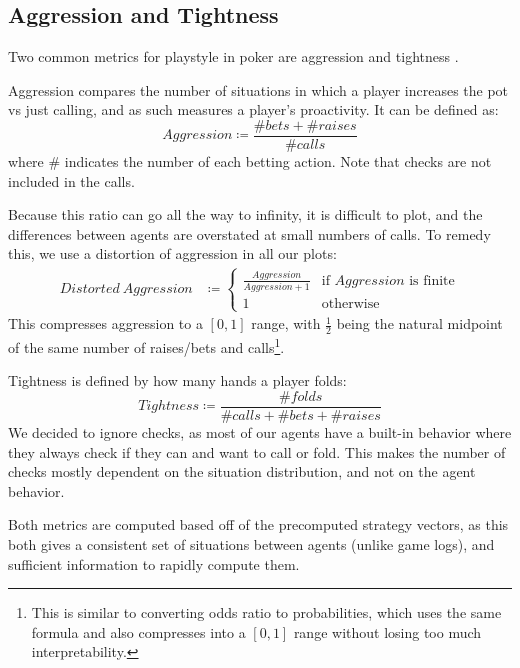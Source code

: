 
\subsection{Aggression and Tightness}

Two common metrics for playstyle in poker are aggression and tightness \cite{PokerStrategy}.

Aggression compares the number of situations in which a player increases the pot vs just calling, and as such measures a player's proactivity. It can be defined as:
\begin{equation}
    Aggression \coloneqq \frac{\# bets + \# raises}{\# calls}
\end{equation} where \# indicates the number of each betting action. Note that checks are not included in the calls.

Because this ratio can go all the way to infinity, it is difficult to plot, and the differences between agents are overstated at small numbers of calls. To remedy this, we use a distortion of aggression in all our plots:
\begin{equation}
\begin{split}
Distorted\ Aggression &\coloneqq \begin{cases}
\frac{Aggression}{Aggression + 1} &\mbox{if }Aggression\mbox{ is finite} \\
1 &\mbox{otherwise}
\end{cases}
\end{split}
\end{equation}
This compresses aggression to a $[0, 1]$ range, with $\frac{1}{2}$ being the natural midpoint of the same number of raises/bets and calls\footnote{This is similar to converting odds ratio to probabilities, which uses the same formula and also compresses into a $[0, 1]$ range without losing too much interpretability.}.

Tightness is defined by how many hands a player folds:
\begin{equation}
    Tightness \coloneqq \frac{\# folds}{\# calls + \# bets + \# raises}
\end{equation}
We decided to ignore checks, as most of our agents have a built-in behavior where they always check if they can and want to call or fold. This makes the number of checks mostly dependent on the situation distribution, and not on the agent behavior.

Both metrics are computed based off of the precomputed strategy vectors, as this both gives a consistent set of situations between agents (unlike game logs), and sufficient information to rapidly compute them.
